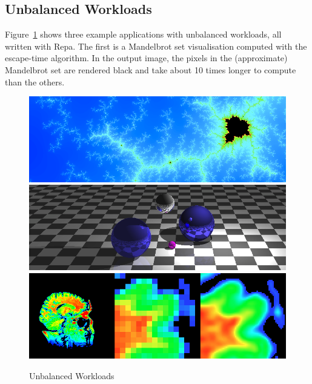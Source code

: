 \subsection{Unbalanced Workloads}
\label{section:Unbalanced}
Figure~\ref{figure:UnbalancedImages} shows three example applications with unbalanced workloads, all written with Repa. The first is a Mandelbrot set visualisation computed with the escape-time algorithm. In the output image, the pixels in the (approximate) Mandelbrot set are rendered black and take about 10 times longer to compute than the others.


\begin{figure}
\begin{center}
\includegraphics[scale=0.3]{figs/mandel/mandel-lightened}\\
\includegraphics[scale=0.3]{figs/ray/ray-lightened}\\
\includegraphics[scale=0.3]{figs/spline/spline-montage}
\caption{Unbalanced Workloads}
\label{figure:UnbalancedImages}
\end{center}
\end{figure}

